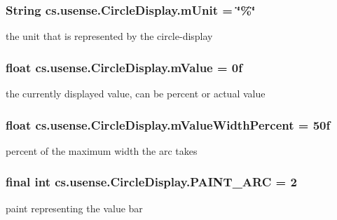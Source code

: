 \subsubsection[{m\+Unit}]{\setlength{\rightskip}{0pt plus 5cm}String cs.\+usense.\+Circle\+Display.\+m\+Unit = \char`\"{}\%\char`\"{}\hspace{0.3cm}{\ttfamily [private]}}\label{classcs_1_1usense_1_1_circle_display_aa4629b8ff331f623b98a6380ba49d4be}
the unit that is represented by the circle-\/display \hypertarget{classcs_1_1usense_1_1_circle_display_ae97b6fa969777e049aca8fab0cb7c9c9}{}
\subsubsection[{m\+Value}]{\setlength{\rightskip}{0pt plus 5cm}float cs.\+usense.\+Circle\+Display.\+m\+Value = 0f\hspace{0.3cm}{\ttfamily [private]}}\label{classcs_1_1usense_1_1_circle_display_ae97b6fa969777e049aca8fab0cb7c9c9}
the currently displayed value, can be percent or actual value \hypertarget{classcs_1_1usense_1_1_circle_display_a176d021c3d9b4fc092cb6fcfccde335c}{}
\subsubsection[{m\+Value\+Width\+Percent}]{\setlength{\rightskip}{0pt plus 5cm}float cs.\+usense.\+Circle\+Display.\+m\+Value\+Width\+Percent = 50f\hspace{0.3cm}{\ttfamily [private]}}\label{classcs_1_1usense_1_1_circle_display_a176d021c3d9b4fc092cb6fcfccde335c}
percent of the maximum width the arc takes \hypertarget{classcs_1_1usense_1_1_circle_display_ae1b0c1a2c3410fae27918a7149cbaeea}{}
\subsubsection[{P\+A\+I\+N\+T\+\_\+\+A\+R\+C}]{\setlength{\rightskip}{0pt plus 5cm}final int cs.\+usense.\+Circle\+Display.\+P\+A\+I\+N\+T\+\_\+\+A\+R\+C = 2\hspace{0.3cm}{\ttfamily [static]}}\label{classcs_1_1usense_1_1_circle_display_ae1b0c1a2c3410fae27918a7149cbaeea}
paint representing the value bar \hypertarget{classcs_1_1usense_1_1_circle_display_afe7dda2665396e0c6f1e43913b9cea99}{}
